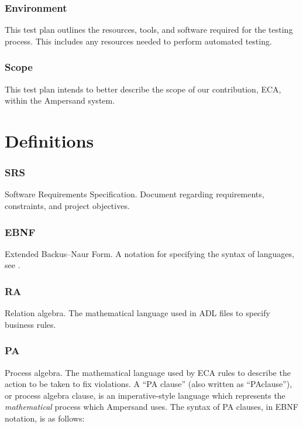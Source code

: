 \documentclass[12pt]{report}
\begin{document}
\subsubsection*{Environment}
This test plan outlines the resources, tools, and software required for the
testing process. This includes any resources needed to perform automated testing. 

\subsubsection*{Scope}
This test plan intends to better describe the scope of our contribution, ECA,
within the Ampersand system. 

\section{Definitions}\label{sec:Abbrev}

\subsubsection*{SRS}
Software Requirements Specification. Document regarding requirements, constraints, and project objectives.

\subsubsection*{EBNF}
Extended Backus–Naur Form. A notation for specifying the syntax of languages, see \cite{ebnf}.

\subsubsection*{RA}
Relation algebra. The mathematical language used in ADL files to specify business rules. 

\subsubsection*{PA}
Process algebra. The mathematical language used by ECA rules to describe the
action to be taken to fix violations. A ``PA clause'' (also written as
``PAclause''), or process algebra clause, is an imperative-style language which
represents the \emph{mathematical} process which Ampersand uses. The syntax of
PA clauses, in EBNF notation, is as follows: 
\end{document}
